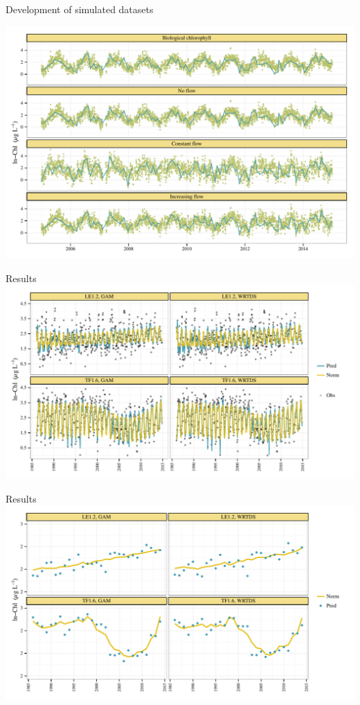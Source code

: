 \documentclass[serif]{beamer}\usepackage[]{graphicx}\usepackage[]{color}
\makeatletter
\def\maxwidth{ %
  \ifdim\Gin@nat@width>\linewidth
    \linewidth
  \else
    \Gin@nat@width
  \fi
}
\newenvironment{knitrout}{}{} %
\makeatother
\begin{document}
\begin{frame}[fragile]{Development of simulated datasets}
\begin{knitrout}
\color{fgcolor}

{\centering \includegraphics[width=\maxwidth]{figs/unnamed-chunk-2-1} 

}



\end{knitrout}
\end{frame}



\begin{frame}{Results}
\includegraphics[width=\textwidth]{figs/predmo.pdf}
\end{frame}

\begin{frame}{Results}
\includegraphics[width=\textwidth]{figs/predann.pdf}
\end{frame}
\end{document}
